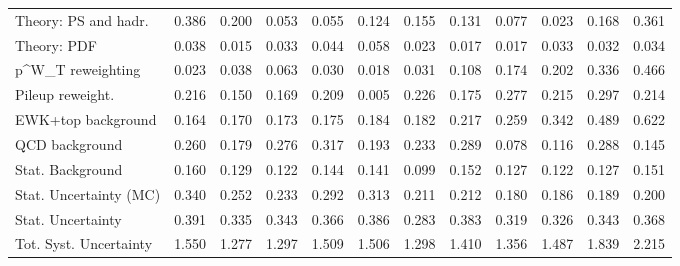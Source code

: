 \begin{tabular}{l|p{0.6cm}p{0.6cm}p{0.6cm}p{0.6cm}p{0.6cm}p{0.6cm}p{0.6cm}p{0.6cm}p{0.6cm}p{0.6cm}p{0.6cm}}
Theory: PS and hadr.                     & 0.386 & 0.200 & 0.053 & 0.055 & 0.124 & 0.155 & 0.131 & 0.077 & 0.023 & 0.168 & 0.361 \\
Theory: PDF                              & 0.038 & 0.015 & 0.033 & 0.044 & 0.058 & 0.023 & 0.017 & 0.017 & 0.033 & 0.032 & 0.034 \\
p^{W}_{T} reweighting                    & 0.023 & 0.038 & 0.063 & 0.030 & 0.018 & 0.031 & 0.108 & 0.174 & 0.202 & 0.336 & 0.466 \\
Pileup reweight.                         & 0.216 & 0.150 & 0.169 & 0.209 & 0.005 & 0.226 & 0.175 & 0.277 & 0.215 & 0.297 & 0.214 \\
EWK+top background                       & 0.164 & 0.170 & 0.173 & 0.175 & 0.184 & 0.182 & 0.217 & 0.259 & 0.342 & 0.489 & 0.622 \\
QCD background                           & 0.260 & 0.179 & 0.276 & 0.317 & 0.193 & 0.233 & 0.289 & 0.078 & 0.116 & 0.288 & 0.145 \\
Stat. Background                         & 0.160 & 0.129 & 0.122 & 0.144 & 0.141 & 0.099 & 0.152 & 0.127 & 0.122 & 0.127 & 0.151 \\
Stat. Uncertainty (MC)                   & 0.340 & 0.252 & 0.233 & 0.292 & 0.313 & 0.211 & 0.212 & 0.180 & 0.186 & 0.189 & 0.200 \\
\hline
Stat. Uncertainty                        & 0.391 & 0.335 & 0.343 & 0.366 & 0.386 & 0.283 & 0.383 & 0.319 & 0.326 & 0.343 & 0.368 \\
\hline
Tot. Syst. Uncertainty                   & 1.550 & 1.277 & 1.297 & 1.509 & 1.506 & 1.298 & 1.410 & 1.356 & 1.487 & 1.839 & 2.215 \\
\hline
\end{tabular}
